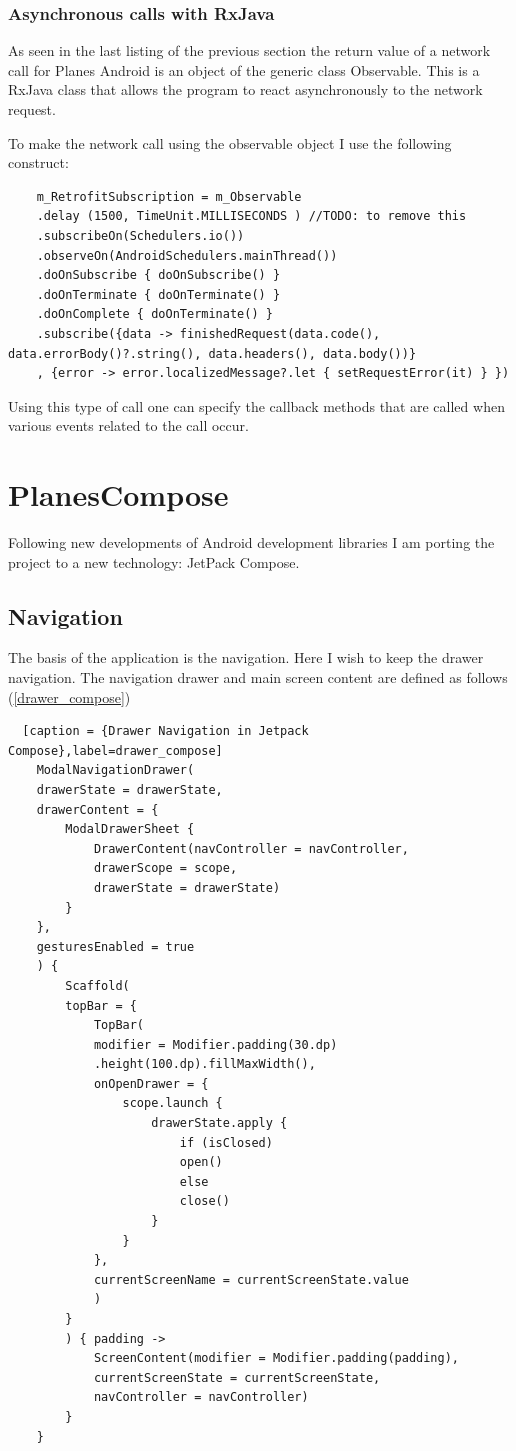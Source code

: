\subsubsection { Asynchronous calls with RxJava } \label{rxjava}

As seen in the last listing of the previous section the return value of a network call for Planes Android is an object of the generic class Observable. This is a RxJava class that allows the program to react asynchronously to the network request.

To make the network call using the observable object I use the following construct:

\begin{lstlisting}
	m_RetrofitSubscription = m_Observable
	.delay (1500, TimeUnit.MILLISECONDS ) //TODO: to remove this
	.subscribeOn(Schedulers.io())
	.observeOn(AndroidSchedulers.mainThread())
	.doOnSubscribe { doOnSubscribe() }
	.doOnTerminate { doOnTerminate() }
	.doOnComplete { doOnTerminate() }
	.subscribe({data -> finishedRequest(data.code(), data.errorBody()?.string(), data.headers(), data.body())}
	, {error -> error.localizedMessage?.let { setRequestError(it) } })
\end{lstlisting}

Using this type of call one can specify the callback methods that are called when various events related to the call occur.

\section{PlanesCompose}

Following new developments of Android development libraries I am porting the project to a new technology: JetPack Compose. 

\subsection{Navigation}

The basis of the application is the navigation. Here I wish to keep the drawer navigation. 
The navigation drawer and main screen content are defined as follows (\ref{drawer_compose})

\begin{lstlisting}  [caption = {Drawer Navigation in Jetpack Compose},label=drawer_compose]
	ModalNavigationDrawer(
	drawerState = drawerState,
	drawerContent = {
		ModalDrawerSheet {
			DrawerContent(navController = navController,
			drawerScope = scope,
			drawerState = drawerState)
		}
	},
	gesturesEnabled = true
	) {
		Scaffold(
		topBar = {
			TopBar(
			modifier = Modifier.padding(30.dp)
			.height(100.dp).fillMaxWidth(),
			onOpenDrawer = {
				scope.launch {
					drawerState.apply {
						if (isClosed)
						open()
						else
						close()
					}
				}
			},
			currentScreenName = currentScreenState.value
			)
		}
		) { padding ->
			ScreenContent(modifier = Modifier.padding(padding),
			currentScreenState = currentScreenState,
			navController = navController)
		}
	}
\end{lstlisting}

